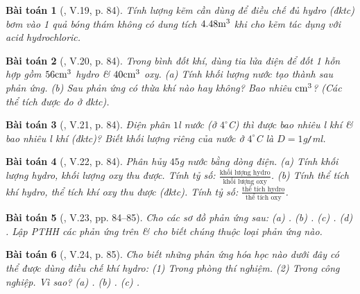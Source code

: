 \documentclass{article}
\newtheorem{baitoan}{Bài toán}
\begin{document}
\begin{baitoan}[\cite{Truong_BTNC_Hoa_Hoc_8_2022}, V.19, p. 84]
	Tính lượng kẽm cần dùng để điều chế đủ hydro (đktc) bơm vào 1 quả bóng thám không có dung tích $\rm4.48m^3$ khi cho kẽm tác dụng với acid hydrochloric.
\end{baitoan}

\begin{baitoan}[\cite{Truong_BTNC_Hoa_Hoc_8_2022}, V.20, p. 84]
	Trong bình đốt khí, dùng tia lửa điện để đốt 1 hỗn hợp gồm $\rm56cm^3$ hydro \& $\rm40cm^3$ oxy. (a) Tính khối lượng nước tạo thành sau phản ứng. (b) Sau phản ứng có thừa khí nào hay không? Bao nhiêu $\rm cm^3$? (Các thể tích được đo ở đktc).
\end{baitoan}

\begin{baitoan}[\cite{Truong_BTNC_Hoa_Hoc_8_2022}, V.21, p. 84]
	Điện phân $1$\emph{l} nước (ở $4^\circ$C) thì được bao nhiêu \emph{l} khí \emph{} \& bao nhiêu \emph{l} khí \emph{} (đktc)? Biết khối lượng riêng của nước ở $4^\circ$C là $D = 1$\emph{g\texttt{/}ml}.
\end{baitoan}

\begin{baitoan}[\cite{Truong_BTNC_Hoa_Hoc_8_2022}, V.22, p. 84]
	Phân hủy $45$\emph{g} nước bằng dòng điện. (a) Tính khối lượng hydro, khối lượng oxy thu được. Tính tỷ số: $\frac{\mbox{khối lượng hydro}}{\mbox{khối lượng oxy}}$. (b) Tính thể tích khí hydro, thể tích khí oxy thu được (đktc). Tính tỷ số: $\frac{\mbox{thể tích hydro}}{\mbox{thể tích oxy}}$.
\end{baitoan}

\begin{baitoan}[\cite{Truong_BTNC_Hoa_Hoc_8_2022}, V.23, pp. 84--85]
	Cho các sơ đồ phản ứng sau: (a) \emph{}. (b) \emph{}. (c) \emph{}. (d) \emph{}. Lập PTHH các phản ứng trên \& cho biết chúng thuộc loại phản ứng nào.
\end{baitoan}

\begin{baitoan}[\cite{Truong_BTNC_Hoa_Hoc_8_2022}, V.24, p. 85]
	Cho biết những phản ứng hóa học nào dưới đây có thể được dùng điều chế khí hydro: (1) Trong phòng thí nghiệm. (2) Trong công nghiệp. Vì sao? (a) \emph{}. (b) \emph{}. (c) \emph{}.
\end{baitoan}
\end{document}
